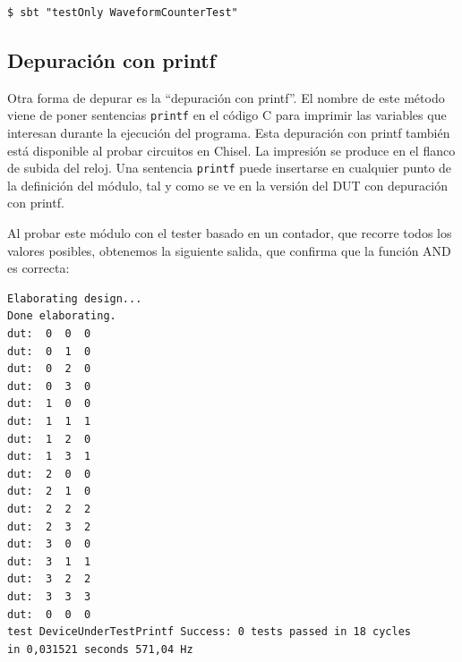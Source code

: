 \documentclass[%
    10pt,
    headinclude, footinclude=false,
    openright, %
    notitlepage,
    cleardoublepage=empty,
    headsepline,
    numbers=noenddot,
    bibliography=totoc, index=totoc,
    ]{scrbook}
\newcommand{\code}[1]{{\lstinline[basicstyle=\small\ttfamily]{#1}}}
\begin{document}
\begin{verbatim}
$ sbt "testOnly WaveformCounterTest"
\end{verbatim}

\subsection{Depuración con printf}



Otra forma de depurar es la ``depuración con printf''. El nombre de este método viene de
poner sentencias \code{printf} en el código C para imprimir las variables que interesan durante
la ejecución del programa. Esta depuración con printf también está disponible al probar
circuitos en Chisel. La impresión se produce en el flanco de subida del reloj.
Una sentencia \code{printf} puede insertarse en cualquier punto de la definición del módulo,
tal y como se ve en la versión del DUT con depuración con printf.



\noindent Al probar este módulo con el tester basado en un contador, que recorre todos los valores
posibles, obtenemos la siguiente salida, que confirma que la función AND es correcta:

\begin{verbatim}
Elaborating design...
Done elaborating.
dut:  0  0  0
dut:  0  1  0
dut:  0  2  0
dut:  0  3  0
dut:  1  0  0
dut:  1  1  1
dut:  1  2  0
dut:  1  3  1
dut:  2  0  0
dut:  2  1  0
dut:  2  2  2
dut:  2  3  2
dut:  3  0  0
dut:  3  1  1
dut:  3  2  2
dut:  3  3  3
dut:  0  0  0
test DeviceUnderTestPrintf Success: 0 tests passed in 18 cycles
in 0,031521 seconds 571,04 Hz
\end{verbatim}
\end{document}
